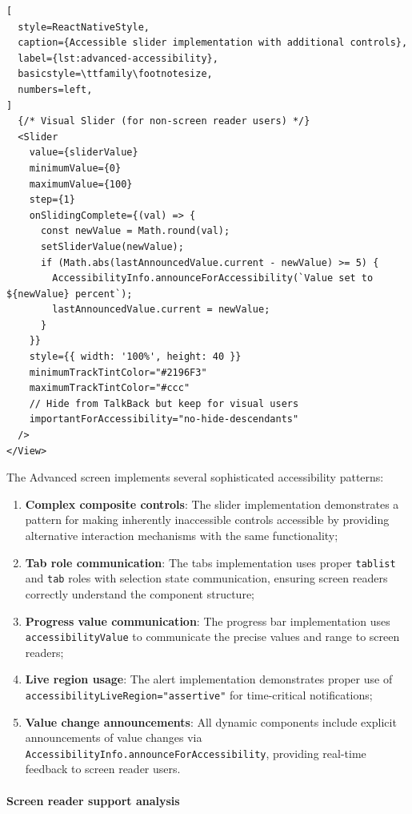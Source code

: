 \begin{lstlisting}[
  style=ReactNativeStyle,
  caption={Accessible slider implementation with additional controls},
  label={lst:advanced-accessibility},
  basicstyle=\ttfamily\footnotesize,
  numbers=left,
]
  {/* Visual Slider (for non-screen reader users) */}
  <Slider
    value={sliderValue}
    minimumValue={0}
    maximumValue={100}
    step={1}
    onSlidingComplete={(val) => {
      const newValue = Math.round(val);
      setSliderValue(newValue);
      if (Math.abs(lastAnnouncedValue.current - newValue) >= 5) {
        AccessibilityInfo.announceForAccessibility(`Value set to ${newValue} percent`);
        lastAnnouncedValue.current = newValue;
      }
    }}
    style={{ width: '100%', height: 40 }}
    minimumTrackTintColor="#2196F3"
    maximumTrackTintColor="#ccc"
    // Hide from TalkBack but keep for visual users
    importantForAccessibility="no-hide-descendants"
  />
</View>
\end{lstlisting}

The Advanced screen implements several sophisticated accessibility patterns:

\begin{enumerate}
    \item \textbf{Complex composite controls}: The slider implementation demonstrates a pattern for making inherently inaccessible controls accessible by providing alternative interaction mechanisms with the same functionality;
    
    \item \textbf{Tab role communication}: The tabs implementation uses proper \texttt{tablist} and \texttt{tab} roles with selection state communication, ensuring screen readers correctly understand the component structure;
    
    \item \textbf{Progress value communication}: The progress bar implementation uses \texttt{accessibilityValue} to communicate the precise values and range to screen readers;
    
    \item \textbf{Live region usage}: The alert implementation demonstrates proper use of \texttt{accessibilityLiveRegion="assertive"} for time-critical notifications;
    
    \item \textbf{Value change announcements}: All dynamic components include explicit announcements of value changes via \texttt{AccessibilityInfo.announceForAccessibility}, providing real-time feedback to screen reader users.
\end{enumerate}

\paragraph{Screen reader support analysis}

